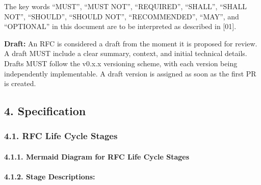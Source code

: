 The key words ``MUST'', ``MUST NOT'', ``REQUIRED'', ``SHALL'', ``SHALL
NOT'', ``SHOULD'', ``SHOULD NOT'', ``RECOMMENDED'', ``MAY'', and
``OPTIONAL'' in this document are to be interpreted as described in
{[}01{]}.

\textbf{Draft:} An RFC is considered a draft from the moment it is
proposed for review. A draft MUST include a clear summary, context, and
initial technical details. Drafts MUST follow the v0.x.x versioning
scheme, with each version being independently implementable. A draft
version is assigned as soon as the first PR is created.

\subsection{4. Specification}\label{specification}

\subsubsection{4.1. RFC Life Cycle Stages}\label{rfc-life-cycle-stages}

\paragraph{\texorpdfstring{4.1.1. \textbf{Mermaid Diagram for RFC Life
Cycle
Stages}}{4.1.1. Mermaid Diagram for RFC Life Cycle Stages}}\label{mermaid-diagram-for-rfc-life-cycle-stages}

\paragraph{\texorpdfstring{4.1.2. \textbf{Stage
Descriptions:}}{4.1.2. Stage Descriptions:}}\label{stage-descriptions}

